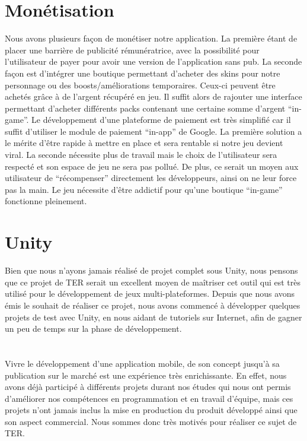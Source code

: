 \documentclass[a4paper,11pt]{article}
\begin{document}
\section{Monétisation}
Nous avons plusieurs façon de monétiser notre application. La première étant de placer une barrière de publicité rémunératrice, avec la possibilité pour l’utilisateur de payer pour avoir une version de l’application sans pub. La seconde façon est d’intégrer une boutique permettant d’acheter des skins pour notre personnage ou des boosts/améliorations temporaires. Ceux-ci peuvent être achetés grâce à de l’argent récupéré en jeu. Il suffit alors de rajouter une interface permettant d’acheter différents packs contenant une certaine somme d’argent “in-game”. Le développement d’une plateforme de paiement est très simplifié car il suffit d’utiliser le module de paiement “in-app” de Google.
\linebreak
La première solution a le mérite d’être rapide à mettre en place et sera rentable si notre jeu devient viral. La seconde nécessite plus de travail mais le choix de l’utilisateur sera respecté et son espace de jeu ne sera pas pollué. De plus, ce serait un moyen aux utilisateur de “récompenser” directement les développeurs, ainsi on ne leur force pas la main. Le jeu nécessite d’être addictif pour qu’une boutique “in-game” fonctionne pleinement.


\section{Unity}
Bien que nous n’ayons jamais réalisé de projet complet sous Unity, nous pensons que ce projet de TER serait un excellent moyen de maîtriser cet outil qui est très utilisé pour le développement de jeux multi-plateformes.
Depuis que nous avons émis le souhait de réaliser ce projet, nous avons commencé à développer quelques projets de test avec Unity, en nous aidant de tutoriels sur Internet, afin de gagner un peu de temps sur la phase de développement.


\section*{}
Vivre le développement d’une application mobile, de son concept jusqu’à sa publication sur le marché est une expérience très enrichissante. En effet, nous avons déjà participé à différents projets durant nos études qui nous ont permis d’améliorer nos compétences en programmation et en travail d’équipe, mais ces projets n’ont jamais inclus la mise en production du produit développé ainsi que son aspect commercial. Nous sommes donc très motivés pour réaliser ce sujet de TER.
\end{document}
